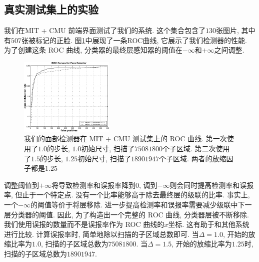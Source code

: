 \documentclass[a4paper,utf8,11pt]{ctexart}
\begin{document}
\subsection{真实测试集上的实验}
我们在MIT + CMU 前端界面测试了我们的系统\citep{rowley1998neural}. 这个集合包含了$130$张图片, 其中有$507$张被标记的正脸. 图\ref{fig:step_dif}中展现了一条ROC曲线, 它展示了我们检测器的性能. 为了创建这条 ROC 曲线, 分类器的最终层感知器的阈值在$-\infty$和$+\infty$之间调整. 
\begin{figure}[!b]
\centering
\includegraphics[width=0.4\textwidth]{step_dif.png}
\caption{我们的面部检测器在 MIT + CMU 测试集上的 ROC 曲线. 第一次使用了$1.0$的步长, $1.0$初始尺寸, 扫描了$75081800$个子区域. 第二次使用了$1.5$的步长, $1.25$初始尺寸, 扫描了$18901947$个子区域. 两者的放缩因子都是$1.25$}
\label{fig:step_dif}
\end{figure}
调整阈值到$+\infty$将导致检测率和误报率降到$0$, 调到$-\infty$则会同时提高检测率和误报率, 但止于一个特定点. 没有一个比率能够高于除去最终层的级联的比率.
事实上, 一个$-\infty$的阈值等价于将层移除. 进一步提高检测率和误报率需要减少级联中下一层分类器的阈值. 因此, 为了构造出一个完整的 ROC 曲线, 分类器层被不断移除.
我们使用误报的数量而不是误报率作为 ROC 曲线的$x$坐标. 这有助于和其他系统进行比较. 计算误报率时, 简单地除以扫描的子区域总数即可.
当$\Delta=1.0$, 开始的放缩比率为$1.0$, 扫描的子区域总数为$75081800$. 当$\Delta=1.5$, 开始的放缩比率为$1.25$时, 扫描的子区域总数为$18901947$.
\end{document}

